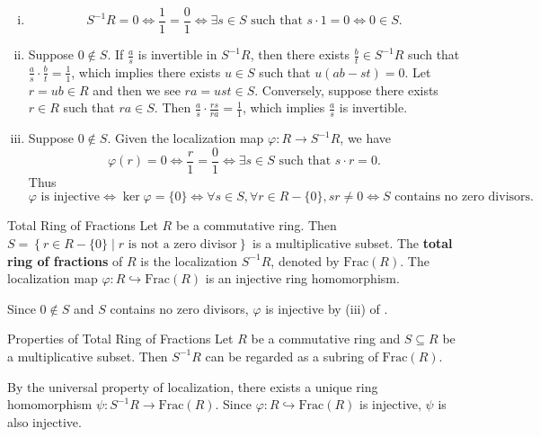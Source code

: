\begin{prf}
    \begin{enumerate}[(i)]
        \item \[
            S^{-1}R=0\iff \frac{1}{1}=\frac{0}{1}\iff \exists s\in S\text{ such that }s\cdot 1=0\iff 0\in S.
            \]
        \item Suppose $0\notin S$. If $\frac{a}{s}$ is invertible in $S^{-1}R$, then there exists $\frac{b}{t}\in S^{-1}R$ such that $\frac{a}{s}\cdot\frac{b}{t}=\frac{1}{1}$, which implies there exists $u\in S$ such that $u(ab-st)=0$. Let $r=ub\in R$ and then we see $ra=ust\in S$. Conversely, suppose there exists $r\in R$ such that $ra\in S$. Then $\frac{a}{s}\cdot\frac{rs}{ra}=\frac{1}{1}$, which implies $\frac{a}{s}$ is invertible.
        \item Suppose $0\notin S$. Given the localization map $\varphi:R\to S^{-1}R$, we have
        \[
            \varphi(r)=0\iff \frac{r}{1}=\frac{0}{1}\iff \exists s\in S\text{ such that }s\cdot r=0.
        \]
        Thus 
        $$
        \varphi\text{ is injective}\iff \ker \varphi=\{0\}\iff \forall s\in S,\forall r\in R-\{0\},sr\ne 0\iff S\text{ contains no zero divisors}.
        $$
    \end{enumerate}
\end{prf}


\begin{definition}{Total Ring of Fractions}{}
    Let $R$ be a commutative ring. Then $S=\left\{r\in R-\{0\}\mid r\text{ is not a zero divisor}\right\}$ is a multiplicative subset. The \textbf{total ring of fractions} of $R$ is the localization $S^{-1}R$, denoted by $\mathrm{Frac}(R)$. The localization map $\varphi:R\hookrightarrow \mathrm{Frac}(R)$ is an injective ring homomorphism.
\end{definition}

\begin{prf}
    Since $0\notin S$ and $S$ contains no zero divisors, $\varphi$ is injective by (iii) of .
\end{prf}

\begin{proposition}{Properties of Total Ring of Fractions}{}
    Let $R$ be a commutative ring and $S\subseteq R$ be a multiplicative subset. Then $S^{-1}R$ can be regarded as a subring of $\mathrm{Frac}(R)$. 
\end{proposition}

\begin{prf}
    By the universal property of localization, there exists a unique ring homomorphism $\psi:S^{-1}R\to \mathrm{Frac}(R)$. Since $\varphi:R\hookrightarrow \mathrm{Frac}(R)$ is injective, $\psi$ is also injective.
\end{prf}

